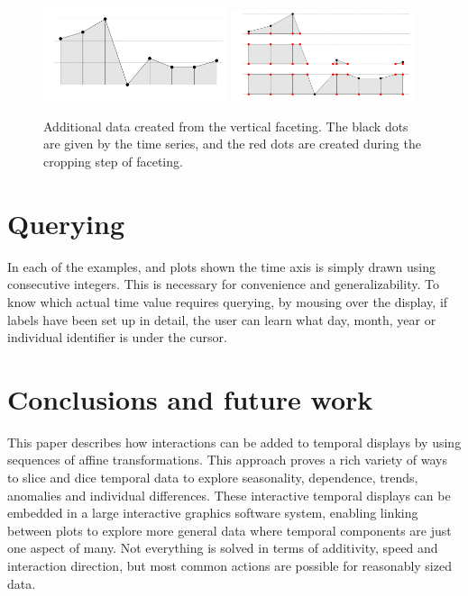 \documentclass[12pt]{article}
\begin{document}
\begin{itemize}
\begin{center}
\begin{figure}[htp]
\begin{centering}
\includegraphics[width=0.48\textwidth]{graph/pipeline-23-1}
\includegraphics[width=0.48\textwidth]{graph/pipeline-23-2}
\end{centering}
\caption{\label{fig:Additional-data}Additional data created from the vertical
faceting. The black dots are given by the time series, and the red
dots are created during the cropping step of faceting.}
\end{figure}
\end{center}

\end{itemize}

\section{Querying}

In each of the examples, and plots shown the time axis is
simply drawn using consecutive integers. This is necessary
for convenience and generalizability. To know which actual
time value requires querying, by mousing over the display,
if labels have been set up in detail, the user can learn what
day, month, year or individual identifier is under the cursor.

\section{Conclusions and future work}

This paper describes how interactions can be added to temporal displays by using sequences of affine transformations. This approach proves a rich variety of ways to slice and dice temporal data to explore seasonality, dependence, trends, anomalies and individual differences. These interactive temporal displays can be embedded in a large interactive graphics software system, enabling linking between plots to explore more general data where temporal components are just one aspect of many. Not everything is solved in terms of additivity, speed and interaction direction, but most common actions are possible for reasonably sized data.
\end{document}
